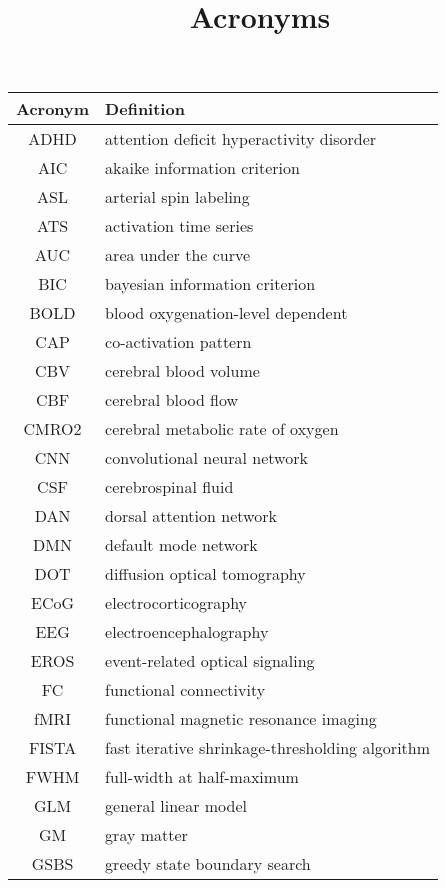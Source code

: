 \title{Acronyms}

\begin{table}[h]
    \centering
    \begin{tabular}{|c|p{}|}
    \hline
    \textbf{Acronym} & \textbf{Definition} \\
    \hline
    ADHD & attention deficit hyperactivity disorder \\
    \hline
    AIC & akaike information criterion \\
    \hline
    ASL & arterial spin labeling \\
    \hline
    ATS & activation time series \\
    \hline
    AUC & area under the curve \\
    \hline
    BIC & bayesian information criterion \\
    \hline
    BOLD & blood oxygenation-level dependent \\
    \hline
    CAP & co-activation pattern \\
    \hline
    CBV & cerebral blood volume \\
    \hline
    CBF & cerebral blood flow \\
    \hline
    CMRO2 & cerebral metabolic rate of oxygen \\
    \hline
    CNN & convolutional neural network \\
    \hline
    CSF & cerebrospinal fluid \\
    \hline
    DAN & dorsal attention network \\
    \hline
    DMN & default mode network \\
    \hline
    DOT & diffusion optical tomography \\
    \hline
    ECoG & electrocorticography \\
    \hline
    EEG & electroencephalography \\
    \hline
    EROS & event-related optical signaling \\
    \hline
    FC & functional connectivity \\
    \hline
    fMRI & functional magnetic resonance imaging \\
    \hline
    FISTA & fast iterative shrinkage-thresholding algorithm \\
    \hline
    FWHM & full-width at half-maximum \\
    \hline
    GLM & general linear model \\
    \hline
    GM & gray matter \\
    \hline
    GSBS & greedy state boundary search \\

\end{tabular}
\end{table}
